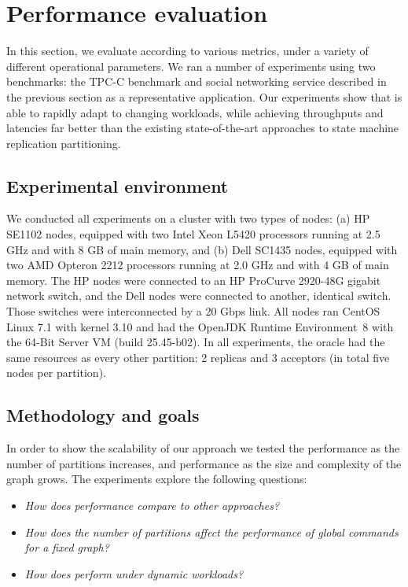 \section{Performance evaluation}
\label{sec:experiments}

In this section, we evaluate \dynastar{} according to various metrics,
under a variety of different operational parameters.
We ran a number of experiments using two benchmarks: the TPC-C benchmark and
\appname{} social networking service described in the previous section as a
representative application.  
Our experiments show that \dynastar{} is able to rapidly adapt to changing 
workloads, while achieving throughputs and latencies far better than the existing
state-of-the-art approaches to state machine replication partitioning.


\subsection{Experimental environment}
\label{sec:evaluation:setup}

We conducted all experiments on a cluster with two types of nodes: (a)
HP SE1102 nodes, equipped with two Intel Xeon L5420 processors running
at 2.5 GHz and with 8 GB of main memory, and (b) Dell SC1435 nodes,
equipped with two AMD Opteron 2212 processors running at 2.0 GHz and
with 4 GB of main memory. The HP nodes were connected to an HP
ProCurve 2920-48G gigabit network switch, and the Dell nodes were
connected to another, identical switch. Those switches were
interconnected by a 20 Gbps link.  All nodes ran CentOS Linux 7.1 with
kernel 3.10 and had the OpenJDK Runtime Environment~8 with the
\mbox{64-Bit} Server VM (build 25.45-b02). In all experiments, the oracle 
had the same resources as every other partition: 2 replicas and 3 acceptors 
(in total five nodes per partition).


\subsection{Methodology and goals}
\label{sec:evaluation:methodology}

In order to show the scalability of our approach we tested the performance as the 
number of partitions increases, and performance as the size and complexity of the graph grows.
The experiments explore the following questions:
\begin{itemize}
\item \emph{How does \dynastar performance compare to other approaches?} 
\item \emph{How does the number of partitions affect the performance of global commands for a fixed graph?}
\item \emph{How does \dynastar perform under dynamic workloads?}
\end{itemize}

